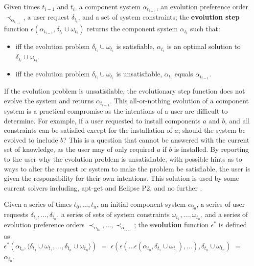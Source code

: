\begin{defs}
\label{formal.stepdef}
Given times $t_{i-1}$ and $t_i$, a component system $\alpha_{t_{i-1}}$, an evolution preference order $\prec_{\alpha_{t_{i-1}}}$, 
a user request $\delta_{t_i}$, and a set of system constraints;
the \textbf{evolution step} function  $\epsilon(\alpha_{t_{i-1}},\delta_{t_i} \cup \omega_{t_i})$ returns the component system $\alpha_{t_i}$ such that:
\begin{itemize}
  \item iff the evolution problem $\delta_{t_i} \cup \omega_{t_i}$ is satisfiable, $\alpha_{t_i}$ is an optimal solution to $\delta_{t_i} \cup \omega_{t_i}$.
  \item iff the evolution problem $\delta_{t_i} \cup \omega_{t_i}$ is unsatisfiable, $\alpha_{t_i}$ equals $\alpha_{t_{i-1}}$.
\end{itemize}
\end{defs}
If the evolution problem is unsatisfiable, the evolutionary step function does not evolve the system and returns $\alpha_{t_{i-1}}$.
This all-or-nothing evolution of a component system is a practical compromise as the intentions of a user are difficult to determine.
For example, if a user requested to install components $a$ and $b$, and all constraints can be satisfied except for the installation of $a$; should the system be evolved to include $b$?
This is a question that cannot be answered with the current set of knowledge, as the user may of only required $a$ if $b$ is installed.
By reporting to the user why the evolution problem is unsatisfiable, with possible hints as to ways to alter the request or system to make the problem be satisfiable,
the user is given the responsibility for their own intentions.
This solution is used by some current solvers including, apt-get and Eclipse P2, and no further . 

\begin{defs}
Given a series of times $t_0,\ldots,t_n$, an initial component system $\alpha_{t_0}$, 
a series of user requests $\delta_{t_1},\ldots,\delta_{t_n}$, a series of sets of system constraints $\omega_{t_1},\ldots,\omega_{t_n}$,
and a series of evolution preference orders $\prec_{\alpha_{t_0}},\ldots, \prec_{\alpha_{t_{n-1}}}$;
the \textbf{evolution} function $\epsilon^*$ is defined as\\
$\epsilon^*(\alpha_{t_0},\langle \delta_{t_1} \cup \omega_{t_1},\ldots,\delta_{t_n} \cup \omega_{t_n} \rangle)$ $=$ $\epsilon(\epsilon(\ldots \epsilon(\alpha_{t_0},\delta_{t_1} \cup \omega_{t_1}),\ldots),\delta_{t_n} \cup \omega_{t_n})$
$=$ $\alpha_{t_n}$.
\end{defs}

